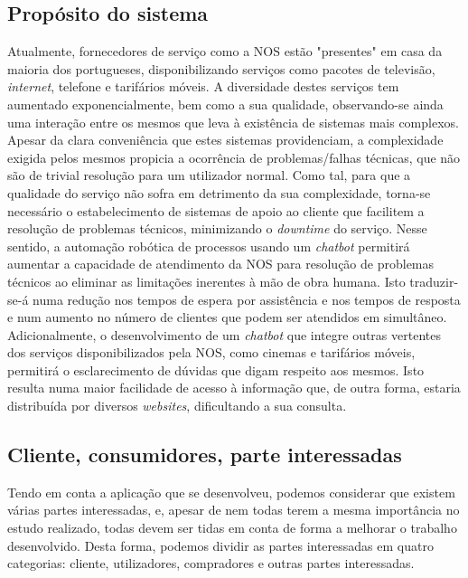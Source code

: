 \documentclass[11pt,a4paper]{article}
\begin{document}
\subsection{Propósito do sistema}
Atualmente, fornecedores de serviço como a NOS estão "presentes" em casa da maioria dos portugueses,
disponibilizando serviços como pacotes de televisão, \textit{internet}, telefone e tarifários móveis.  A
diversidade destes serviços tem aumentado exponencialmente, bem como a sua qualidade, observando-se ainda
uma interação entre os mesmos que leva à existência de sistemas mais complexos.  Apesar da clara
conveniência que estes sistemas providenciam, a complexidade exigida pelos mesmos propicia a ocorrência de
problemas/falhas técnicas, que não são de trivial resolução para um utilizador normal. Como tal, para que a
qualidade do serviço não sofra em detrimento da sua complexidade, torna-se necessário o estabelecimento de
sistemas de apoio ao cliente que facilitem a resolução de problemas técnicos, minimizando o
\textit{downtime} do serviço.  Nesse sentido, a automação robótica de processos usando um \textit{chatbot}
permitirá aumentar a capacidade de atendimento da NOS para resolução de problemas técnicos ao eliminar as
limitações inerentes à mão de obra humana. Isto traduzir-se-á numa redução nos tempos de espera por
assistência e nos tempos de resposta e num aumento no número de clientes que podem ser atendidos em
simultâneo.  Adicionalmente, o desenvolvimento de um \textit{chatbot} que integre outras vertentes dos
serviços disponibilizados pela NOS, como cinemas e tarifários móveis, permitirá o esclarecimento de dúvidas
que digam respeito aos mesmos. Isto resulta numa maior facilidade de acesso à informação que, de outra
forma, estaria distribuída por diversos \textit{websites}, dificultando a sua consulta.


\subsection{Cliente, consumidores, parte interessadas}

Tendo em conta a aplicação que se desenvolveu, podemos considerar que existem várias partes
interessadas, e, apesar de nem todas terem a mesma importância no estudo realizado, todas devem ser tidas em
conta de forma a melhorar o trabalho desenvolvido. Desta forma, podemos dividir as partes interessadas em
quatro categorias: cliente, utilizadores, compradores e outras partes interessadas.
\end{document}

